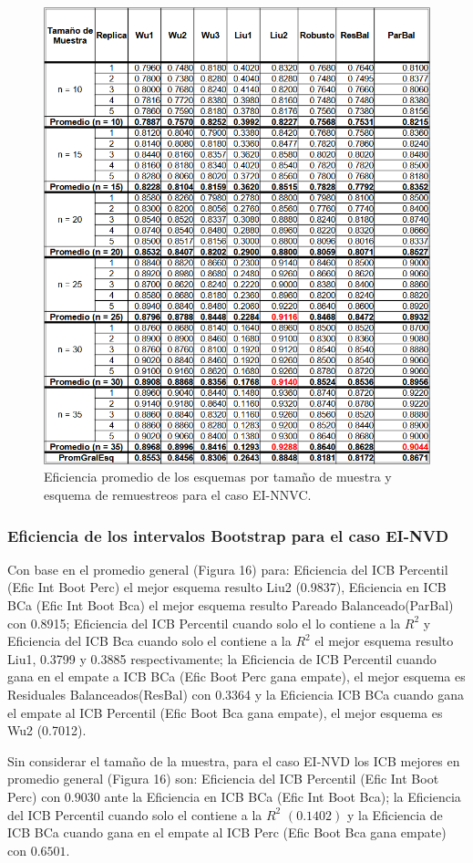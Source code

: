 \begin{figure}[ht] 
	\centering 
	\includegraphics[width=0.70\linewidth]{img/EI_NNVC_Efic_Esq.png} 
	\caption{Eficiencia promedio de los esquemas por tamaño de muestra y esquema de remuestreos para el caso EI-NNVC.} 
	\label{fig:EI_NNVC_Esq}
\end{figure}
\FloatBarrier


\subsubsection{Eficiencia de los intervalos Bootstrap para el caso EI-NVD}
Con base en el promedio general (Figura 16) para: Eficiencia del ICB Percentil (Efic Int Boot Perc) el mejor esquema resulto Liu2 (0.9837), Eficiencia en ICB BCa (Efic Int Boot Bca) el mejor esquema resulto Pareado Balanceado(ParBal) con 0.8915; Eficiencia del ICB Percentil cuando solo el lo contiene a la $R^{2}$ y Eficiencia del ICB Bca cuando solo el contiene a la $R^{2}$ el mejor esquema resulto Liu1, 0.3799 y 0.3885 respectivamente; la Eficiencia de ICB Percentil cuando gana en el empate a ICB BCa (Efic Boot Perc gana empate), el mejor esquema es Residuales Balanceados(ResBal) con 0.3364 y la Eficiencia ICB BCa cuando gana el empate al ICB Percentil (Efic Boot Bca gana empate), el mejor esquema es Wu2 (0.7012).
\vspace{.5cm}


Sin considerar el tamaño de la muestra, para el caso EI-NVD los ICB mejores en promedio general (Figura 16) son: Eficiencia del ICB Percentil (Efic Int Boot Perc) con $0.9030$ ante la Eficiencia en ICB BCa (Efic Int Boot Bca); la Eficiencia del ICB Percentil cuando solo el contiene a la $R^{2}$ $(0.1402)$ y la Eficiencia de ICB BCa cuando gana en el empate al ICB Perc (Efic Boot Bca gana empate) con $0.6501$.


